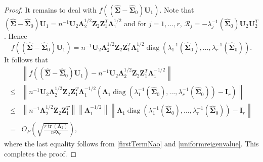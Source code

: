 \documentclass[12pt]{article} %
\DeclareMathOperator{\mytr}{tr}
\DeclareMathOperator{\mydiag}{diag}
\newcommand{\bZ}{\mathbf{Z}}
\newcommand{\bI}{\mathbf{I}}
\newcommand{\bU}{\mathbf{U}}
\newcommand{\bfsym}[1]{\ensuremath{\boldsymbol{#1}}}
\def\blambda {\bfsym {\lambda}}
\def\bLambda {\bfsym {\Lambda}}
\def\bSigma {\bfsym {\Sigma}}
\theoremstyle{definition}
\begin{document}
\begin{appendices}
\begin{proof}
    It remains to deal with $
                f(
                    (\hat{\bSigma}-\hat{\bSigma}_0) \bU_{1}
                )
    $. Note that
$(\hat{\bSigma}-\hat{\bSigma}_0)\bU_1 = n^{-1} \bU_2 \bLambda_2^{1/2} \bZ_2 \bZ_1^T \bLambda_1^{1/2}$
and  for $j=1,\ldots, r$,
$\mathcal{R}_j=-\lambda_j^{-1}(\hat{\bSigma}_0) \bU_2 \bU_2^T$.
    Hence
    \begin{equation*}
                f(
                    (\hat{\bSigma}-\hat{\bSigma}_0) \bU_{1}
                )
                =
                n^{-1} \bU_2 \bLambda_2^{1/2} \bZ_2 \bZ_1^T \bLambda_1^{1/2} 
                \mydiag\left(\lambda_1^{-1}(\hat{\bSigma}_0), \ldots,\lambda_r^{-1}(\hat{\bSigma}_0) \right)
                .
    \end{equation*}
It follows that
    \begin{equation*}
        \begin{split}
                &\left\|f((\hat{\bSigma}-\hat{\bSigma}_0) \bU_{1})
                -
                n^{-1} \bU_2 \bLambda_2^{1/2} \bZ_2 \bZ_1^T \bLambda_1^{-1/2}  \right\|
                \\
                \leq&
                \left\|
                n^{-1} \bU_2 \bLambda_2^{1/2} \bZ_2 \bZ_1^T \bLambda_1^{-1/2} 
                \left(
                \bLambda_1
                \mydiag\left(\lambda_1^{-1}(\hat{\bSigma}_0), \ldots,\lambda_r^{-1}(\hat{\bSigma}_0) \right)
                - \bI_r
                \right)
                \right\|
                \\
                \leq &
                \left\|
                n^{-1} \bLambda_2^{1/2} \bZ_2 \bZ_1^T
                \right\|
                \left\|
                \bLambda_1^{-1/2} 
                \right\|
                \left\|
                \bLambda_1
                \mydiag\left(\lambda_1^{-1}(\hat{\bSigma}_0), \ldots,\lambda_r^{-1}(\hat{\bSigma}_0) \right)
                -\bI_r
                \right\|
                \\
                =&
                O_P
                \left(
                    \sqrt{\frac{r\mytr(\bLambda_2)}{n^2\blambda_r}}
    \right)
    ,
        \end{split}
    \end{equation*}
    where the last equality follows from \eqref{firstTermNao} and
    \eqref{uniformreigenvalue}.
    This completes the proof.
\end{proof}




\end{appendices}
\end{document}
